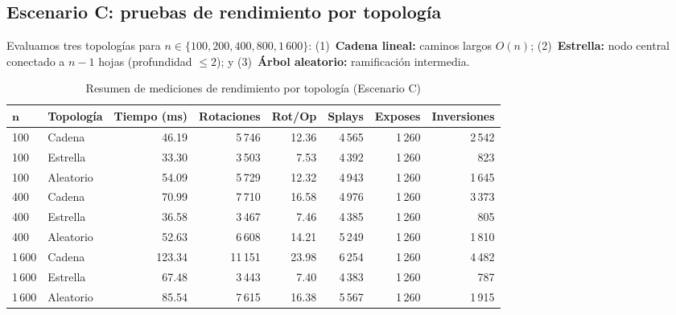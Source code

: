 \subsection{Escenario C: pruebas de rendimiento por topología}
Evaluamos tres topologías para $n \in \{100, 200, 400, 800, 1\,600\}$: (1)~\textbf{Cadena lineal:} caminos largos $O(n)$; (2)~\textbf{Estrella:} nodo central conectado a $n-1$ hojas (profundidad $\le 2$); y (3)~\textbf{Árbol aleatorio:} ramificación intermedia.

\begin{table}[H]
    \caption{Resumen de mediciones de rendimiento por topología (Escenario C)}
    \label{tab:escenario_c}
    \centering
    \scriptsize
    \setlength{\tabcolsep}{4pt}
    \begin{tabular*}{\textwidth}{@{\extracolsep{\fill}}llrrrrrr}
        \toprule
        $\mathbf{n}$ & \textbf{Topología} & \textbf{Tiempo (ms)} & \textbf{Rotaciones} & \textbf{Rot/Op} & \textbf{Splays} & \textbf{Exposes} & \textbf{Inversiones} \\
        \midrule
        100   & Cadena    & 46.19 & 5\,746  & 12.36 & 4\,565 & 1\,260 & 2\,542 \\
        100   & Estrella  & 33.30 & 3\,503  & 7.53  & 4\,392 & 1\,260 & 823    \\
        100   & Aleatorio & 54.09 & 5\,729  & 12.32 & 4\,943 & 1\,260 & 1\,645 \\
        \midrule
        400   & Cadena    & 70.99 & 7\,710  & 16.58 & 4\,976 & 1\,260 & 3\,373 \\
        400   & Estrella  & 36.58 & 3\,467  & 7.46  & 4\,385 & 1\,260 & 805    \\
        400   & Aleatorio & 52.63 & 6\,608  & 14.21 & 5\,249 & 1\,260 & 1\,810 \\
        \midrule
        1\,600 & Cadena    & 123.34 & 11\,151 & 23.98 & 6\,254 & 1\,260 & 4\,482 \\
        1\,600 & Estrella  & 67.48  & 3\,443  & 7.40  & 4\,383 & 1\,260 & 787    \\
        1\,600 & Aleatorio & 85.54  & 7\,615  & 16.38 & 5\,567 & 1\,260 & 1\,915 \\
        \bottomrule
    \end{tabular*}
\end{table}

\clearpage
